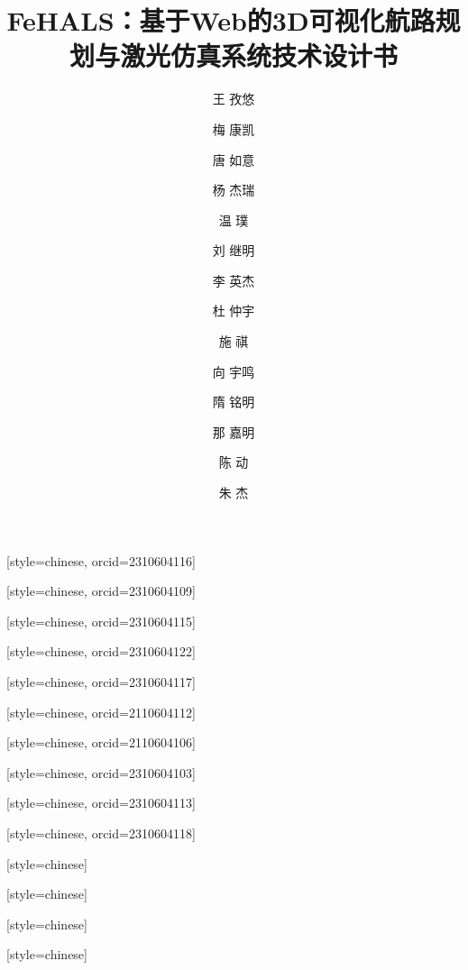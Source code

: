 \documentclass[a4paper,fleqn]{cas-sc}
\begin{document}
\let\WriteBookmarks\relax
\def\floatpagepagefraction{1}
\def\textpagefraction{.001}

\shorttitle{}
\title[mode=title]{FeHALS：基于Web的3D可视化航路规划与激光仿真系统技术设计书}




\author[1]{王 孜悠}[style=chinese, orcid=2310604116]

\author[1]{梅 康凯}[style=chinese, orcid=2310604109]

\author[1]{唐 如意}[style=chinese, orcid=2310604115]

\author[1]{杨 杰瑞}[style=chinese, orcid=2310604122]

\author[1]{温 璞}[style=chinese, orcid=2310604117]

\author[1]{刘 继明}[style=chinese, orcid=2110604112]

\author[1]{李 英杰}[style=chinese, orcid=2110604106]

\author[1]{杜 仲宇}[style=chinese, orcid=2310604103]

\author[1]{施 祺}[style=chinese, orcid=2310604113]

\author[1]{向 宇鸣}[style=chinese, orcid=2310604118]

\author[1]{隋 铭明}[style=chinese]
\fnmark[1]

\author[1]{那 嘉明}[style=chinese]
\fnmark[1]

\author[1]{陈 动}[style=chinese]
\fnmark[1]

\author[1]{朱 杰}[style=chinese]
\fnmark[1]

\end{document}
